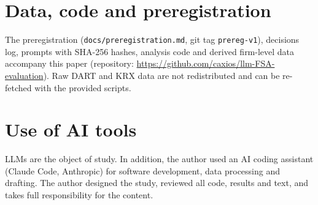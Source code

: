 \documentclass[11pt]{article}
\begin{document}
\section*{Data, code and preregistration}
The preregistration (\texttt{docs/preregistration.md}, git tag \texttt{prereg-v1}), decisions log, prompts with SHA-256 hashes, analysis code and derived firm-level data accompany this paper (repository: \url{https://github.com/caxios/llm-FSA-evaluation}). Raw DART and KRX data are not redistributed and can be re-fetched with the provided scripts.

\section*{Use of AI tools}
LLMs are the object of study. In addition, the author used an AI coding assistant (Claude Code, Anthropic) for software development, data processing and drafting. The author designed the study, reviewed all code, results and text, and takes full responsibility for the content.



\end{document}
